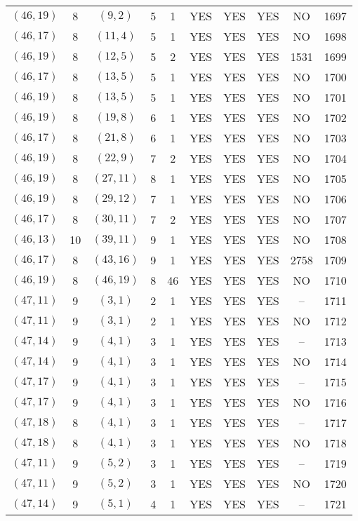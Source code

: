 \begin{longtable}{|c|c|c|c|c|c|c|c|c|c|}
$(46, 19)$ & 8 & $(9, 2)$ & 5 & 1 & YES & YES & YES & NO & 1697\\
$(46, 17)$ & 8 & $(11, 4)$ & 5 & 1 & YES & YES & YES & NO & 1698\\
$(46, 19)$ & 8 & $(12, 5)$ & 5 & 2 & YES & YES & YES & 1531 & 1699\\
$(46, 17)$ & 8 & $(13, 5)$ & 5 & 1 & YES & YES & YES & NO & 1700\\
$(46, 19)$ & 8 & $(13, 5)$ & 5 & 1 & YES & YES & YES & NO & 1701\\
$(46, 19)$ & 8 & $(19, 8)$ & 6 & 1 & YES & YES & YES & NO & 1702\\
$(46, 17)$ & 8 & $(21, 8)$ & 6 & 1 & YES & YES & YES & NO & 1703\\
$(46, 19)$ & 8 & $(22, 9)$ & 7 & 2 & YES & YES & YES & NO & 1704\\
$(46, 19)$ & 8 & $(27, 11)$ & 8 & 1 & YES & YES & YES & NO & 1705\\
$(46, 19)$ & 8 & $(29, 12)$ & 7 & 1 & YES & YES & YES & NO & 1706\\
$(46, 17)$ & 8 & $(30, 11)$ & 7 & 2 & YES & YES & YES & NO & 1707\\
$(46, 13)$ & 10 & $(39, 11)$ & 9 & 1 & YES & YES & YES & NO & 1708\\
$(46, 17)$ & 8 & $(43, 16)$ & 9 & 1 & YES & YES & YES & 2758 & 1709\\
$(46, 19)$ & 8 & $(46, 19)$ & 8 & 46 & YES & YES & YES & NO & 1710\\
$(47, 11)$ & 9 & $(3, 1)$ & 2 & 1 & YES & YES & YES & -- & 1711\\
$(47, 11)$ & 9 & $(3, 1)$ & 2 & 1 & YES & YES & YES & NO & 1712\\
$(47, 14)$ & 9 & $(4, 1)$ & 3 & 1 & YES & YES & YES & -- & 1713\\
$(47, 14)$ & 9 & $(4, 1)$ & 3 & 1 & YES & YES & YES & NO & 1714\\
$(47, 17)$ & 9 & $(4, 1)$ & 3 & 1 & YES & YES & YES & -- & 1715\\
$(47, 17)$ & 9 & $(4, 1)$ & 3 & 1 & YES & YES & YES & NO & 1716\\
$(47, 18)$ & 8 & $(4, 1)$ & 3 & 1 & YES & YES & YES & -- & 1717\\
$(47, 18)$ & 8 & $(4, 1)$ & 3 & 1 & YES & YES & YES & NO & 1718\\
$(47, 11)$ & 9 & $(5, 2)$ & 3 & 1 & YES & YES & YES & -- & 1719\\
$(47, 11)$ & 9 & $(5, 2)$ & 3 & 1 & YES & YES & YES & NO & 1720\\
$(47, 14)$ & 9 & $(5, 1)$ & 4 & 1 & YES & YES & YES & -- & 1721\\

\end{longtable}
